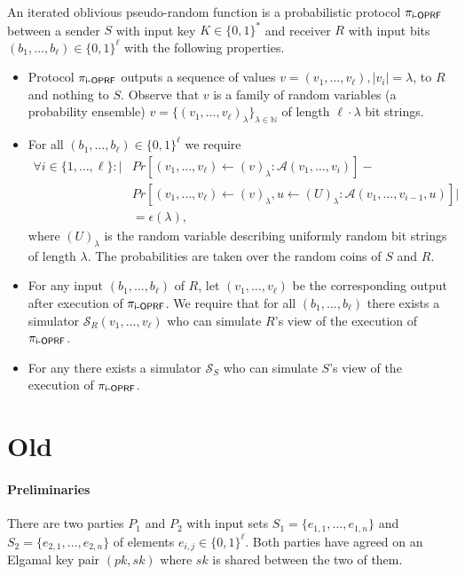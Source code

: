 \documentclass{article}
\newcommand{\dash}[0]{{\text -}}
\newcommand{\A}[0]{{\mathcal{A}}}
\newcommand{\ioprf}[0]{\mathsf{i}\dash\mathsf{OPRF}}
\newcommand{\proto}[0]{{\pi_{\ioprf}}}
\newcommand{\myS}[0]{{\mathcal{S}}}
\newcommand{\N}[0]{{\mathbb{N}}}
\begin{document}
An iterated oblivious pseudo-random function is a probabilistic protocol
$\proto$ between a sender $S$ with input key $K\in\{0,1\}^*$ and receiver $R$
with input bits $(b_1,\ldots,b_\ell)\in\{0,1\}^{\ell}$ with the following properties.

\begin{itemize}
\item Protocol $\proto$ outputs a sequence of values
  $v=(v_1,\ldots,v_\ell),|v_i|=\lambda$, to $R$ and nothing to $S$.
  Observe that $v$ is a family of random variables (a probability
  ensemble) $v=\{(v_1,\ldots,v_\ell)_{\lambda}\}_{\lambda\in\N}$ of length
  $\ell\cdot\lambda$ bit strings.
  
\item 
For all $(b_1,\ldots,b_\ell)\in\{0,1\}^\ell$ we require
\begin{align*}\forall{}i\in\{1,\ldots,\ell\}:|&Pr[(v_1,\ldots,v_\ell)\leftarrow{}(v)_\lambda:\A(v_1,\ldots,v_i)]-\\&Pr[(v_1,\ldots,v_\ell)\leftarrow{}(v)_\lambda,u\leftarrow{}(U)_\lambda:\A(v_1,\ldots,v_{i-1},u)]|\\&=\epsilon(\lambda),
  \end{align*}
  where $(U)_\lambda$ is the random variable describing uniformly random
  bit strings of length $\lambda$. The probabilities are taken over
  the random coins of $S$ and $R$.

\item For any input $(b_1,\ldots,b_\ell)$ of $R$, let
  $(v_1,\ldots,v_\ell)$ be the corresponding output after execution of
  $\proto$. We require that for all $(b_1,\ldots,b_\ell)$ there
  exists a simulator $\myS_R(v_1,\ldots,v_\ell)$ who can
  simulate $R$'s view of the execution of $\proto$.

\item For any there
  exists a simulator $\myS_S$ who can
  simulate $S$'s view of the execution of $\proto$.
  
\end{itemize}

\section{Old}
\paragraph{Preliminaries} There are two parties $P_1$ and $P_2$ with
input sets $S_1=\{e_{1,1},\ldots,e_{1,n}\}$ and
$S_2=\{e_{2,1},\ldots,e_{2,n}\}$ of elements
$e_{i,j}\in\{0,1\}^\ell$. Both parties have agreed on an Elgamal key
pair $(pk,sk)$ where $sk$ is shared between the two of them.
\end{document}

